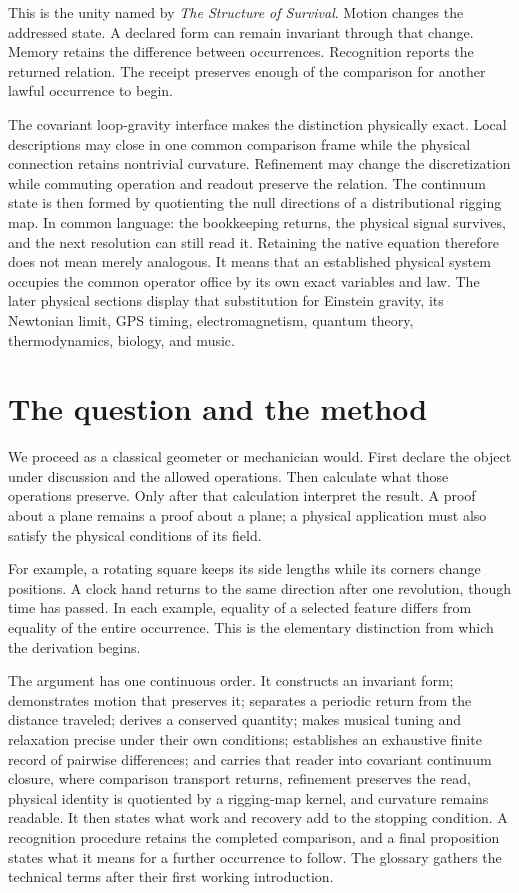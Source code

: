 \documentclass[10pt]{article}
\begin{document}
This is the unity named by \emph{The Structure of Survival}. Motion changes the addressed state. A declared form can remain invariant through that change. Memory retains the difference between occurrences. Recognition reports the returned relation. The receipt preserves enough of the comparison for another lawful occurrence to begin.

The covariant loop-gravity interface makes the distinction physically exact. Local descriptions may close in one common comparison frame while the physical connection retains nontrivial curvature. Refinement may change the discretization while commuting operation and readout preserve the relation. The continuum state is then formed by quotienting the null directions of a distributional rigging map. In common language: the bookkeeping returns, the physical signal survives, and the next resolution can still read it. Retaining the native equation therefore does not mean merely analogous. It means that an established physical system occupies the common operator office by its own exact variables and law. The later physical sections display that substitution for Einstein gravity, its Newtonian limit, GPS timing, electromagnetism, quantum theory, thermodynamics, biology, and music.


\section{The question and the method}
We proceed as a classical geometer or mechanician would. First declare the object under discussion and the allowed operations. Then calculate what those operations preserve. Only after that calculation interpret the result. A proof about a plane remains a proof about a plane; a physical application must also satisfy the physical conditions of its field.

For example, a rotating square keeps its side lengths while its corners change positions. A clock hand returns to the same direction after one revolution, though time has passed. In each example, equality of a selected feature differs from equality of the entire occurrence. This is the elementary distinction from which the derivation begins.

The argument has one continuous order. It constructs an invariant form; demonstrates motion that preserves it; separates a periodic return from the distance traveled; derives a conserved quantity; makes musical tuning and relaxation precise under their own conditions; establishes an exhaustive finite record of pairwise differences; and carries that reader into covariant continuum closure, where comparison transport returns, refinement preserves the read, physical identity is quotiented by a rigging-map kernel, and curvature remains readable. It then states what work and recovery add to the stopping condition. A recognition procedure retains the completed comparison, and a final proposition states what it means for a further occurrence to follow. The glossary gathers the technical terms after their first working introduction.
\end{document}
